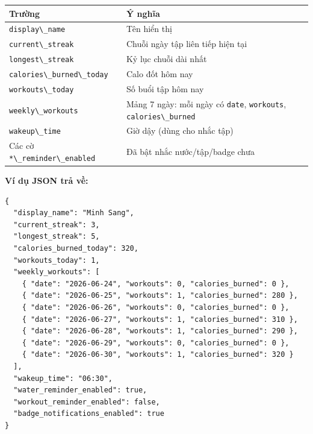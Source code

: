 \documentclass[12pt,a4paper]{article}
\newcounter{none}
\providecommand{\passthrough}[1]{#1}
\begin{document}
{\def\LTcaptype{none} %
\begin{longtable}[]{@{}
  >{\raggedright\arraybackslash}p{}
  >{\raggedright\arraybackslash}p{}@{}}
\toprule\noalign{}
\begin{minipage}[b]{\linewidth}\raggedright
Trường
\end{minipage} & \begin{minipage}[b]{\linewidth}\raggedright
Ý nghĩa
\end{minipage} \\
\midrule\noalign{}
\endhead
\bottomrule\noalign{}
\endlastfoot
\passthrough{\lstinline!display\_name!} & Tên hiển thị \\
\passthrough{\lstinline!current\_streak!} & Chuỗi ngày tập liên tiếp
hiện tại \\
\passthrough{\lstinline!longest\_streak!} & Kỷ lục chuỗi dài nhất \\
\passthrough{\lstinline!calories\_burned\_today!} & Calo đốt hôm nay \\
\passthrough{\lstinline!workouts\_today!} & Số buổi tập hôm nay \\
\passthrough{\lstinline!weekly\_workouts!} & Mảng 7 ngày: mỗi ngày có
\passthrough{\lstinline!date!}, \passthrough{\lstinline!workouts!},
\passthrough{\lstinline!calories\_burned!} \\
\passthrough{\lstinline!wakeup\_time!} & Giờ dậy (dùng cho nhắc tập) \\
Các cờ \passthrough{\lstinline!*\_reminder\_enabled!} & Đã bật nhắc
nước/tập/badge chưa \\
\end{longtable}
}

\textbf{Ví dụ JSON trả về:}

\begin{lstlisting}
{
  "display_name": "Minh Sang",
  "current_streak": 3,
  "longest_streak": 5,
  "calories_burned_today": 320,
  "workouts_today": 1,
  "weekly_workouts": [
    { "date": "2026-06-24", "workouts": 0, "calories_burned": 0 },
    { "date": "2026-06-25", "workouts": 1, "calories_burned": 280 },
    { "date": "2026-06-26", "workouts": 0, "calories_burned": 0 },
    { "date": "2026-06-27", "workouts": 1, "calories_burned": 310 },
    { "date": "2026-06-28", "workouts": 1, "calories_burned": 290 },
    { "date": "2026-06-29", "workouts": 0, "calories_burned": 0 },
    { "date": "2026-06-30", "workouts": 1, "calories_burned": 320 }
  ],
  "wakeup_time": "06:30",
  "water_reminder_enabled": true,
  "workout_reminder_enabled": false,
  "badge_notifications_enabled": true
}

\end{lstlisting}
\end{document}
